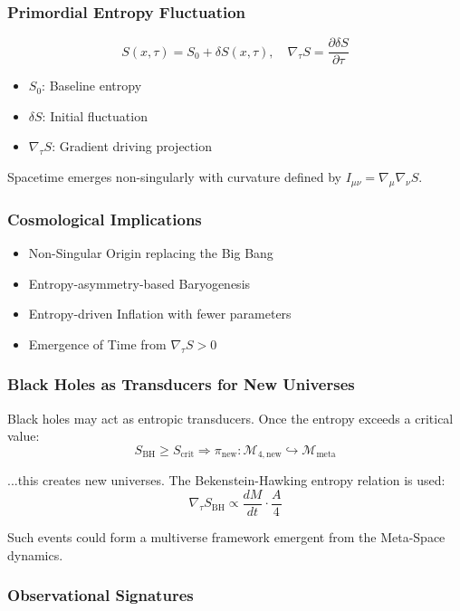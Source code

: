 \documentclass[10.5pt,a4paper]{article}
\begin{document}
\subsubsection{Primordial Entropy Fluctuation}

\[
S(x, \tau) = S_0 + \delta S(x, \tau), \quad \nabla_\tau S = \frac{\partial \delta S}{\partial \tau}
\]

\begin{itemize}
    \item \(S_0\): Baseline entropy
    \item \(\delta S\): Initial fluctuation
    \item \(\nabla_\tau S\): Gradient driving projection
\end{itemize}

Spacetime emerges non-singularly with curvature defined by \(I_{\mu\nu} = \nabla_\mu \nabla_\nu S\).

\subsubsection{Cosmological Implications}

\begin{itemize}
    \item Non-Singular Origin replacing the Big Bang
    \item Entropy-asymmetry-based Baryogenesis
    \item Entropy-driven Inflation with fewer parameters
    \item Emergence of Time from \(\nabla_\tau S > 0\)
\end{itemize}

\subsubsection{Black Holes as Transducers for New Universes}

Black holes may act as entropic transducers. Once the entropy exceeds a critical value:
\[
S_{\text{BH}} \geq S_{\text{crit}} \Rightarrow \pi_{\text{new}}: \mathcal{M}_{4,\text{new}} \hookrightarrow \mathcal{M}_{\text{meta}}
\]

...this creates new universes. The Bekenstein-Hawking entropy relation is used:
\[
\nabla_\tau S_{\text{BH}} \propto \frac{dM}{dt} \cdot \frac{A}{4}
\]

Such events could form a multiverse framework emergent from the Meta-Space dynamics.

\subsubsection{Observational Signatures}
\end{document}
